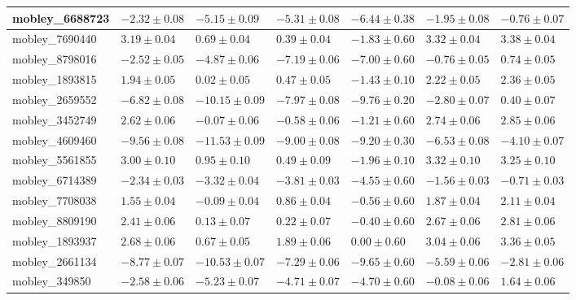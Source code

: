 \documentclass{article}
\begin{document}
\begin{landscape}
\begin{longtable}{|l{3.0cm}|l{3.0cm}|l{3.2cm}|l{3.6cm}|l{3.0cm}|l{3.0cm}|l{3.0cm}|}
mobley\_6688723	&	$	-2.32	\pm	0.08	$	&	$	-5.15	\pm	0.09	$	&	$	-5.31	\pm	0.08	$	&	$	-6.44	\pm	0.38	$	&	$	-1.95	\pm	0.08	$	&	$	-0.76	\pm	0.07	$	\\ \hline
mobley\_7690440	&	$	3.19	\pm	0.04	$	&	$	0.69	\pm	0.04	$	&	$	0.39	\pm	0.04	$	&	$	-1.83	\pm	0.60	$	&	$	3.32	\pm	0.04	$	&	$	3.38	\pm	0.04	$	\\ \hline
mobley\_8798016	&	$	-2.52	\pm	0.05	$	&	$	-4.87	\pm	0.06	$	&	$	-7.19	\pm	0.06	$	&	$	-7.00	\pm	0.60	$	&	$	-0.76	\pm	0.05	$	&	$	0.74	\pm	0.05	$	\\ \hline
mobley\_1893815	&	$	1.94	\pm	0.05	$	&	$	0.02	\pm	0.05	$	&	$	0.47	\pm	0.05	$	&	$	-1.43	\pm	0.10	$	&	$	2.22	\pm	0.05	$	&	$	2.36	\pm	0.05	$	\\ \hline
mobley\_2659552	&	$	-6.82	\pm	0.08	$	&	$	-10.15	\pm	0.09	$	&	$	-7.97	\pm	0.08	$	&	$	-9.76	\pm	0.20	$	&	$	-2.80	\pm	0.07	$	&	$	0.40	\pm	0.07	$	\\ \hline
mobley\_3452749	&	$	2.62	\pm	0.06	$	&	$	-0.07	\pm	0.06	$	&	$	-0.58	\pm	0.06	$	&	$	-1.21	\pm	0.60	$	&	$	2.74	\pm	0.06	$	&	$	2.85	\pm	0.06	$	\\ \hline
mobley\_4609460	&	$	-9.56	\pm	0.08	$	&	$	-11.53	\pm	0.09	$	&	$	-9.00	\pm	0.08	$	&	$	-9.20	\pm	0.30	$	&	$	-6.53	\pm	0.08	$	&	$	-4.10	\pm	0.07	$	\\ \hline
mobley\_5561855	&	$	3.00	\pm	0.10	$	&	$	0.95	\pm	0.10	$	&	$	0.49	\pm	0.09	$	&	$	-1.96	\pm	0.10	$	&	$	3.32	\pm	0.10	$	&	$	3.25	\pm	0.10	$	\\ \hline
mobley\_6714389	&	$	-2.34	\pm	0.03	$	&	$	-3.32	\pm	0.04	$	&	$	-3.81	\pm	0.03	$	&	$	-4.55	\pm	0.60	$	&	$	-1.56	\pm	0.03	$	&	$	-0.71	\pm	0.03	$	\\ \hline
mobley\_7708038	&	$	1.55	\pm	0.04	$	&	$	-0.09	\pm	0.04	$	&	$	0.86	\pm	0.04	$	&	$	-0.56	\pm	0.60	$	&	$	1.87	\pm	0.04	$	&	$	2.11	\pm	0.04	$	\\ \hline
mobley\_8809190	&	$	2.41	\pm	0.06	$	&	$	0.13	\pm	0.07	$	&	$	0.22	\pm	0.07	$	&	$	-0.40	\pm	0.60	$	&	$	2.67	\pm	0.06	$	&	$	2.81	\pm	0.06	$	\\ \hline
mobley\_1893937	&	$	2.68	\pm	0.06	$	&	$	0.67	\pm	0.05	$	&	$	1.89	\pm	0.06	$	&	$	0.00	\pm	0.60	$	&	$	3.04	\pm	0.06	$	&	$	3.36	\pm	0.05	$	\\ \hline
mobley\_2661134	&	$	-8.77	\pm	0.07	$	&	$	-10.53	\pm	0.07	$	&	$	-7.29	\pm	0.06	$	&	$	-9.65	\pm	0.60	$	&	$	-5.59	\pm	0.06	$	&	$	-2.81	\pm	0.06	$	\\ \hline
mobley\_349850	&	$	-2.58	\pm	0.06	$	&	$	-5.23	\pm	0.07	$	&	$	-4.71	\pm	0.07	$	&	$	-4.70	\pm	0.60	$	&	$	-0.08	\pm	0.06	$	&	$	1.64	\pm	0.06	$	\\ \hline

\end{longtable}
\end{landscape}
\end{document}
